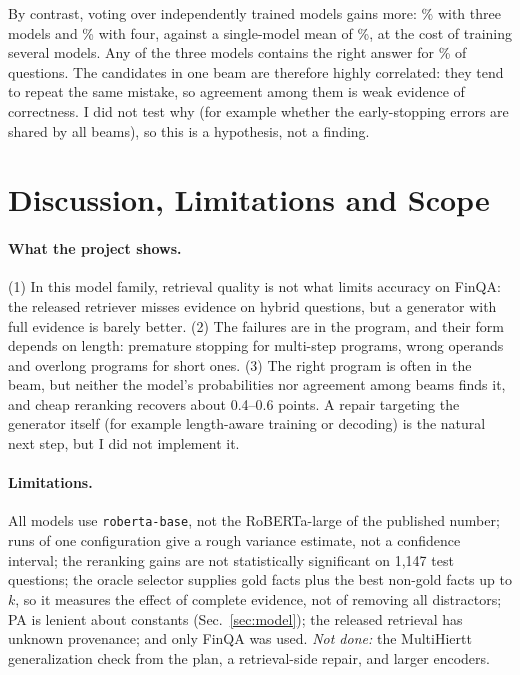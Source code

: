 \documentclass{article}
\newcommand{\code}[1]{\texttt{#1}}
\begin{document}
By contrast, voting over independently trained models gains more: \VoteThree\% with three models and \VoteFour\% with four, against a single-model mean of \SingleEAMean\%, at the cost of training several models. Any of the three models contains the right answer for \AnyThree\% of questions. The candidates in one beam are therefore highly correlated: they tend to repeat the same mistake, so agreement among them is weak evidence of correctness. I did not test why (for example whether the early-stopping errors are shared by all beams), so this is a hypothesis, not a finding.

\section{Discussion, Limitations and Scope}

\paragraph{What the project shows.} (1) In this model family, retrieval quality is not what limits accuracy on FinQA: the released retriever misses evidence on hybrid questions, but a generator with full evidence is barely better. (2) The failures are in the program, and their form depends on length: premature stopping for multi-step programs, wrong operands and overlong programs for short ones. (3) The right program is often in the beam, but neither the model's probabilities nor agreement among beams finds it, and cheap reranking recovers about 0.4--0.6 points. A repair targeting the generator itself (for example length-aware training or decoding) is the natural next step, but I did not implement it.

\paragraph{Limitations.} All models use \code{roberta-base}, not the RoBERTa-large of the published number; \NRuns{} runs of one configuration give a rough variance estimate, not a confidence interval; the reranking gains are not statistically significant on 1{,}147 test questions; the oracle selector supplies gold facts plus the best non-gold facts up to $k$, so it measures the effect of complete evidence, not of removing all distractors; PA is lenient about constants (Sec.~\ref{sec:model}); the released retrieval has unknown provenance; and only FinQA was used. \emph{Not done:} the MultiHiertt generalization check from the plan, a retrieval-side repair, and larger encoders.
\end{document}
